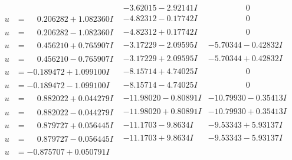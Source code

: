 \documentclass[1p]{elsarticle_modified}
\theoremstyle{definition}
\begin{document}
$$\begin{array}{c|c|c}
 & -3.62015 - 2.92141 I & \phantom{-0.000000 } 0 \\ \hline\begin{aligned}
u &= \phantom{-}0.206282 + 1.082360 I\end{aligned}
 & -4.82312 - 0.17742 I & \phantom{-0.000000 } 0 \\ \hline\begin{aligned}
u &= \phantom{-}0.206282 - 1.082360 I\end{aligned}
 & -4.82312 + 0.17742 I & \phantom{-0.000000 } 0 \\ \hline\begin{aligned}
u &= \phantom{-}0.456210 + 0.765907 I\end{aligned}
 & -3.17229 - 2.09595 I & -5.70344 - 0.42832 I \\ \hline\begin{aligned}
u &= \phantom{-}0.456210 - 0.765907 I\end{aligned}
 & -3.17229 + 2.09595 I & -5.70344 + 0.42832 I \\ \hline\begin{aligned}
u &= -0.189472 + 1.099100 I\end{aligned}
 & -8.15714 + 4.74025 I & \phantom{-0.000000 } 0 \\ \hline\begin{aligned}
u &= -0.189472 - 1.099100 I\end{aligned}
 & -8.15714 - 4.74025 I & \phantom{-0.000000 } 0 \\ \hline\begin{aligned}
u &= \phantom{-}0.882022 + 0.044279 I\end{aligned}
 & -11.98020 - 0.80891 I & -10.79930 - 0.35413 I \\ \hline\begin{aligned}
u &= \phantom{-}0.882022 - 0.044279 I\end{aligned}
 & -11.98020 + 0.80891 I & -10.79930 + 0.35413 I \\ \hline\begin{aligned}
u &= \phantom{-}0.879727 + 0.056445 I\end{aligned}
 & -11.1703 - 9.8634 I & -9.53343 + 5.93137 I \\ \hline\begin{aligned}
u &= \phantom{-}0.879727 - 0.056445 I\end{aligned}
 & -11.1703 + 9.8634 I & -9.53343 - 5.93137 I \\ \hline\begin{aligned}
u &= -0.875707 + 0.050791 I\end{aligned}

\end{array}$$
\end{document}
